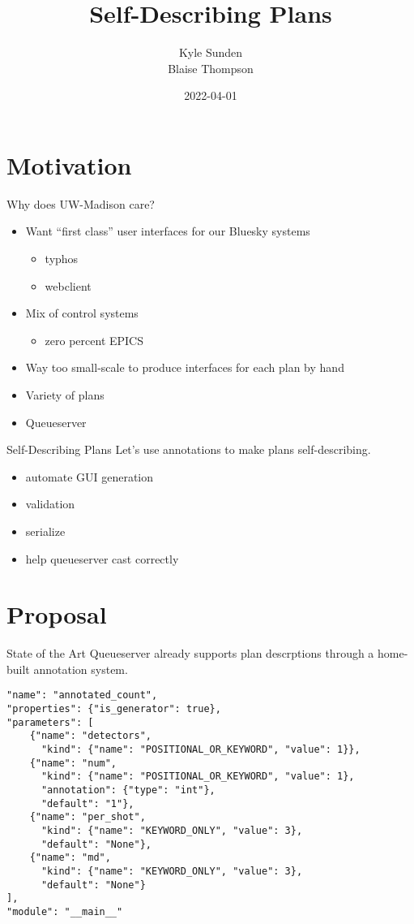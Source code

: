 \documentclass{presentation}
\title{Self-Describing Plans}
\author{Kyle Sunden \\ Blaise Thompson}
\institute{University of Wisconsin--Madison}
\date{2022-04-01}
\begin{document}
\maketitle

\section{Motivation}

\begin{frame}{Why does UW-Madison care?}
  \begin{itemize}
    \item Want ``first class'' user interfaces for our Bluesky systems
    \begin{itemize}
      \item typhos
      \item webclient
    \end{itemize}
    \item Mix of control systems
    \begin{itemize}
      \item zero percent EPICS
    \end{itemize}
    \item Way too small-scale to produce interfaces for each plan by hand
    \item Variety of plans
    \item Queueserver
  \end{itemize}
\end{frame}

\begin{frame}{Self-Describing Plans}
  Let's use annotations to make plans self-describing.
  \begin{itemize}
    \item{automate GUI generation}
    \item{validation}
    \item{serialize}
    \item{help queueserver cast correctly}
  \end{itemize}
\end{frame}

\section{Proposal}

\begin{frame}[fragile]{State of the Art}
  Queueserver already supports plan descrptions through a home-built annotation system.
  \vfill

  \scriptsize
  \begin{verbatim}
"name": "annotated_count",
"properties": {"is_generator": true},
"parameters": [
    {"name": "detectors",
      "kind": {"name": "POSITIONAL_OR_KEYWORD", "value": 1}},
    {"name": "num",
      "kind": {"name": "POSITIONAL_OR_KEYWORD", "value": 1},
      "annotation": {"type": "int"},
      "default": "1"},
    {"name": "per_shot",
      "kind": {"name": "KEYWORD_ONLY", "value": 3},
      "default": "None"},
    {"name": "md",
      "kind": {"name": "KEYWORD_ONLY", "value": 3},
      "default": "None"}
],
"module": "__main__"
  \end{verbatim}
\end{frame}
\end{document}
